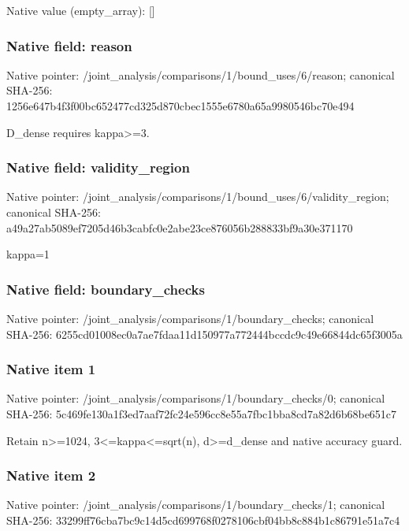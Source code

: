 \documentclass[10pt,a4paper]{article}
\begin{document}
Native value (empty\_\allowbreak{}array): []

\subsubsection{Native field: reason}
Native pointer: /joint\_\allowbreak{}analysis/comparisons/1/bound\_\allowbreak{}uses/6/reason; canonical SHA-256: 1256e647b4f3f00bc652477cd325d870cbec1555e6780a65a9980546bc70e494

\begingroup\raggedright\sloppy D\_\allowbreak{}dense requires kappa>=\allowbreak{}3.\par\endgroup

\subsubsection{Native field: validity\_\allowbreak{}region}
Native pointer: /joint\_\allowbreak{}analysis/comparisons/1/bound\_\allowbreak{}uses/6/validity\_\allowbreak{}region; canonical SHA-256: a49a27ab5089ef7205d46b3cabfc0e2abe23ce876056b288833bf9a30e371170

\begingroup\raggedright\sloppy kappa=\allowbreak{}1\par\endgroup

\subsubsection{Native field: boundary\_\allowbreak{}checks}
Native pointer: /joint\_\allowbreak{}analysis/comparisons/1/boundary\_\allowbreak{}checks; canonical SHA-256: 6255cd01008ec0a7ae7fdaa11d150977a772444bccdc9c49e66844dc65f3005a

\subsubsection{Native item 1}
Native pointer: /joint\_\allowbreak{}analysis/comparisons/1/boundary\_\allowbreak{}checks/0; canonical SHA-256: 5c469fe130a1f3ed7aaf72fc24e596cc8e55a7fbc1bba8cd7a82d6b68be651c7

\begingroup\raggedright\sloppy Retain n>=\allowbreak{}1024,\allowbreak{} 3<=\allowbreak{}kappa<=\allowbreak{}sqrt(n),\allowbreak{} d>=\allowbreak{}d\_\allowbreak{}dense and native accuracy guard.\par\endgroup

\subsubsection{Native item 2}
Native pointer: /joint\_\allowbreak{}analysis/comparisons/1/boundary\_\allowbreak{}checks/1; canonical SHA-256: 33299ff76cba7bc9c14d5cd699768f0278106cbf04bb8c884b1c86791e51a7c4
\end{document}
